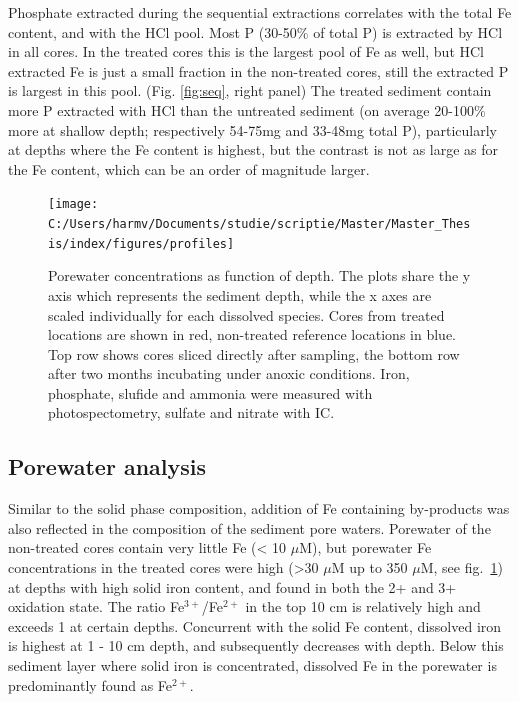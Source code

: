 \documentclass[a4paper,11pt]{article}
\begin{document}
Phosphate extracted during the sequential extractions correlates with the total Fe content, and with the HCl pool. Most P (30-50\% of total P) is extracted by HCl in all cores. In the treated cores this is the largest pool of Fe as well, but HCl extracted Fe is just a small fraction in the non-treated cores, still the extracted P is largest in this pool. (Fig. \ref{fig:seq}, right panel) The treated sediment contain more P extracted with HCl than the untreated sediment (on average 20-100\% more at shallow depth; respectively 54-75mg and 33-48mg total P), particularly at depths where the Fe content is highest, but the contrast is not as large as for the Fe content, which can be an order of magnitude larger.
\begin{figure}

{\centering \texttt{[image: C:/Users/harmv/Documents/studie/scriptie/Master/Master\_Thesis/index/figures/profiles]} 

}

\caption{Porewater concentrations as function of depth. The plots share the y axis which represents the sediment depth, while the x axes are scaled individually for each dissolved species. Cores from treated locations are shown in red, non-treated reference locations in blue. Top row shows cores sliced directly after sampling, the bottom row after two months incubating under anoxic conditions. Iron, phosphate, slufide and ammonia were measured with photospectometry, sulfate and nitrate with IC.}\label{fig:pwprofiles}
\end{figure}
\hypertarget{porewater-analysis}{%
\subsection{Porewater analysis}\label{porewater-analysis}}

Similar to the solid phase composition, addition of Fe containing by-products was also reflected in the composition of the sediment pore waters. Porewater of the non-treated cores contain very little Fe (\textless{} 10 \(\mu\)M), but porewater Fe concentrations in the treated cores were high (\textgreater30 \(\mu\)M up to 350 \(\mu\)M, see fig.~\ref{fig:pwprofiles}) at depths with high solid iron content, and found in both the 2+ and 3+ oxidation state. The ratio Fe\(^{3+}\)/Fe\(^{2+}\) in the top 10 cm is relatively high and exceeds 1 at certain depths. Concurrent with the solid Fe content, dissolved iron is highest at 1 - 10 cm depth, and subsequently decreases with depth. Below this sediment layer where solid iron is concentrated, dissolved Fe in the porewater is predominantly found as Fe\(^{2+}\).
\end{document}
